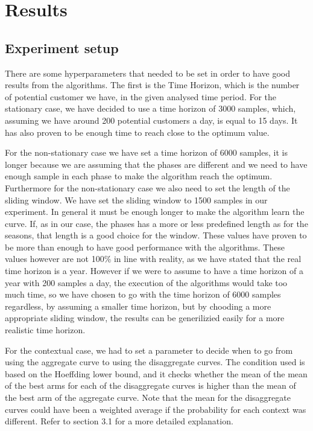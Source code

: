 \newpage
\section{Results}\label{sec:results}

\subsection{Experiment setup}\label{subsec:experiment-setup}

There are some hyperparameters that needed to be set in order to have good results from the algorithms.
The first is the Time Horizon, which is the number of potential customer we have, in the given analysed time period.
For the stationary case, we have decided to use a time horizon of 3000 samples, which, assuming we have around 200 potential
customers a day, is equal to 15 days. It has also proven to be enough time to reach close to the optimum value.

For the non-stationary case we have set a time horizon of 6000 samples, it is longer because we are assuming that
the phases are different and we need to have enough sample in each phase to make the algorithm reach the optimum.
Furthermore for the non-stationary case we also need to set the length of the sliding window. We have set the sliding window to
1500 samples in our experiment. In general it must be enough longer to make the algorithm learn the curve. If, as in our case, the
phases has a more or less predefined length as for the seasons, that length is a good choice for the window.
These values have proven to be more than enough to have good performance with the algorithms.
These values however are not 100\% in line with reality, as we have stated that the real time horizon is a year.
However if we were to assume to have a time horizon of a year with 200 samples a day, the execution of the algorithms would
take too much time, so we have chosen to go with the time horizon of 6000 samples regardless, by assuming a smaller time horizon,
but by chooding a more appropriate sliding window, the results can be generilizied easily for a more realistic time horizon.


For the contextual case, we had to set a parameter to decide when to go from using the aggregate curve to using the
disaggregate curves. The condition used is based on the Hoeffding lower bound, and it checks whether the mean of the mean
of the best arms for each of the disaggregate curves is higher than the mean of the best arm of the aggregate curve.
Note that the mean for the disaggregate curves could have been a weighted average if the probability for each context was different.
Refer to section 3.1 for a more detailed explanation.

